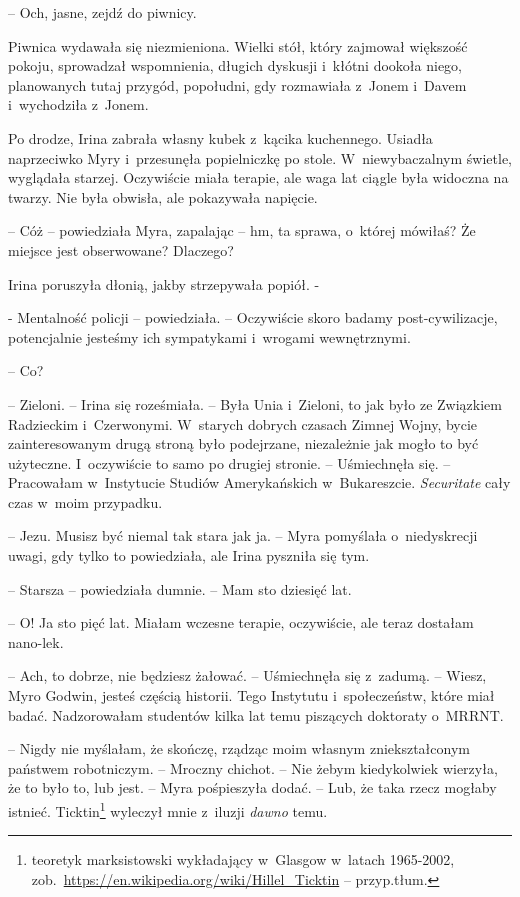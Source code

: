\documentclass[oneside,polish,11pt,sfheadings]{mwbk}
\begin{document}
-- Och, jasne, zejdź do piwnicy.

Piwnica wydawała się niezmieniona. Wielki stół, który zajmował większość
pokoju, sprowadzał wspomnienia, długich dyskusji i~kłótni dookoła niego,
planowanych tutaj przygód, popołudni, gdy rozmawiała z~Jonem i~Davem i~wychodziła z~Jonem.

Po drodze, Irina zabrała własny kubek z~kącika kuchennego. Usiadła
naprzeciwko Myry i~przesunęła popielniczkę po stole. W~niewybaczalnym
świetle, wyglądała starzej. Oczywiście miała terapie, ale waga lat
ciągle była widoczna na twarzy. Nie była obwisła, ale pokazywała
napięcie.

-- Cóż -- powiedziała Myra, zapalając -- hm, ta sprawa, o~której mówiłaś?
Że miejsce jest obserwowane? Dlaczego?

Irina poruszyła dłonią, jakby strzepywała popiół. -

- Mentalność policji -- powiedziała. -- Oczywiście skoro badamy post-cywilizacje, potencjalnie
jesteśmy ich sympatykami i~wrogami wewnętrznymi.

-- Co?

-- Zieloni. -- Irina się roześmiała. -- Była Unia i~Zieloni, to jak było ze
Związkiem Radzieckim i~Czerwonymi. W~starych dobrych czasach Zimnej
Wojny, bycie zainteresowanym drugą stroną było podejrzane, niezależnie
jak mogło to być użyteczne. I~oczywiście to samo po drugiej stronie. -- Uśmiechnęła się. -- Pracowałam w~Instytucie Studiów Amerykańskich w~Bukareszcie. \textit{Securitate} cały czas w~moim przypadku.

-- Jezu. Musisz być niemal tak stara jak ja. -- Myra pomyślała o~niedyskrecji uwagi, gdy tylko to powiedziała, ale Irina pyszniła się
tym.

-- Starsza -- powiedziała dumnie. -- Mam sto dziesięć lat.

-- O! Ja sto pięć lat. Miałam wczesne terapie, oczywiście, ale teraz
dostałam nano-lek.

-- Ach, to dobrze, nie będziesz żałować. -- Uśmiechnęła się z~zadumą. -- Wiesz, Myro Godwin, jesteś częścią historii. Tego Instytutu i~społeczeństw, które miał badać. Nadzorowałam studentów kilka lat temu
piszących doktoraty o~MRRNT.

-- Nigdy nie myślałam, że skończę, rządząc moim własnym zniekształconym
państwem robotniczym. -- Mroczny chichot. -- Nie żebym kiedykolwiek
wierzyła, że to było to, lub jest. -- Myra pośpieszyła dodać. -- Lub, że
taka rzecz mogłaby istnieć. Ticktin\footnote{ teoretyk marksistowski
wykładający w~Glasgow w~latach 1965-2002,
zob.~\url{https://en.wikipedia.org/wiki/Hillel\_Ticktin} -- przyp.tłum.} wyleczył mnie z~iluzji \textit{dawno} temu.
\end{document}
